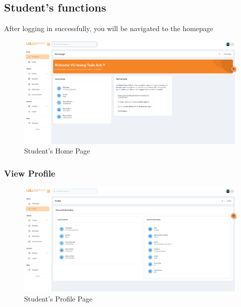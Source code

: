 \subsection{Student's functions}
After logging in successfully, you will be navigated to the homepage

\begin{figure}[H]
	\centering
	\includegraphics[width=1.0\linewidth]{graphics/gui/student/homepage}
	\caption{Student's Home Page}
	\label{fig:gui-std-homepage}
\end{figure}


	\subsubsection{View Profile}
	\begin{figure}[H]
		\centering
		\includegraphics[width=1.0\linewidth]{graphics/gui/student/profile}
		\caption{Student's Profile Page}
		\label{fig:gui-std-profile}
	\end{figure}
	
	
